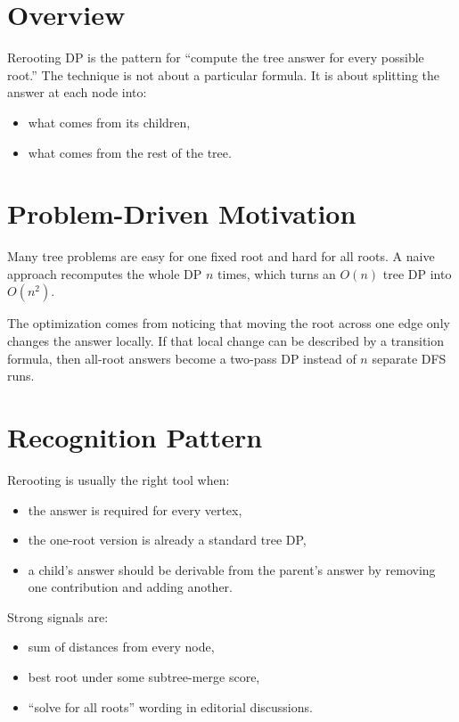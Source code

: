 \section*{Overview}

Rerooting DP is the pattern for ``compute the tree answer for every possible root.'' The technique is not about a
particular formula. It is about splitting the answer at each node into:

\begin{itemize}
  \item what comes from its children,
  \item what comes from the rest of the tree.
\end{itemize}

\section*{Problem-Driven Motivation}

Many tree problems are easy for one fixed root and hard for all roots. A naive approach recomputes the whole DP
\(n\) times, which turns an \(O(n)\) tree DP into \(O(n^2)\).

The optimization comes from noticing that moving the root across one edge only changes the answer locally. If that local
change can be described by a transition formula, then all-root answers become a two-pass DP instead of \(n\) separate
DFS runs.

\section*{Recognition Pattern}

Rerooting is usually the right tool when:

\begin{itemize}
  \item the answer is required for every vertex,
  \item the one-root version is already a standard tree DP,
  \item a child's answer should be derivable from the parent's answer by removing one contribution and adding another.
\end{itemize}

Strong signals are:

\begin{itemize}
  \item sum of distances from every node,
  \item best root under some subtree-merge score,
  \item ``solve for all roots'' wording in editorial discussions.
\end{itemize}

